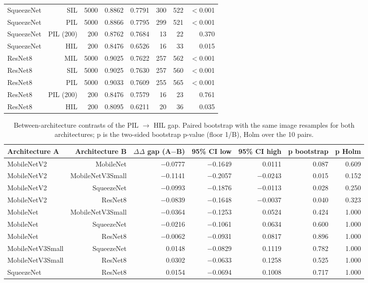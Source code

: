 \begin{table}[htbp]
\begin{tabular}{lrrrrrrr}
SqueezeNet & SIL & 5000 & 0.8862 & 0.7791 & 300 & 522 & $<$0.001 \\
SqueezeNet & PIL & 5000 & 0.8866 & 0.7795 & 299 & 521 & $<$0.001 \\
SqueezeNet & PIL (200) & 200 & 0.8762 & 0.7684 & 13 & 22 & 0.370 \\
SqueezeNet & HIL & 200 & 0.8476 & 0.6526 & 16 & 33 & 0.015 \\
ResNet8 & MIL & 5000 & 0.9025 & 0.7622 & 257 & 562 & $<$0.001 \\
ResNet8 & SIL & 5000 & 0.9025 & 0.7630 & 257 & 560 & $<$0.001 \\
ResNet8 & PIL & 5000 & 0.9033 & 0.7609 & 255 & 565 & $<$0.001 \\
ResNet8 & PIL (200) & 200 & 0.8476 & 0.7579 & 16 & 23 & 0.761 \\
ResNet8 & HIL & 200 & 0.8095 & 0.6211 & 20 & 36 & 0.035 \\
\bottomrule
\end{tabular}
\end{table}

\begin{table}[htbp]
\centering
\scriptsize
\caption{Between-architecture contrasts of the PIL $\rightarrow$ HIL gap. Paired bootstrap with the same image resamples for both architectures; p is the two-sided bootstrap p-value (floor 1/B), Holm over the 10 pairs.}
\label{tab:ladder-coco-6}
\begin{tabular}{lrrrrrr}
\toprule
Architecture A & Architecture B & $\Delta$$\Delta$ gap (A$-$B) & 95\% CI low & 95\% CI high & p bootstrap & p Holm \\
\midrule
MobileNetV2 & MobileNet & $-$0.0777 & $-$0.1649 & 0.0111 & 0.087 & 0.609 \\
MobileNetV2 & MobileNetV3Small & $-$0.1141 & $-$0.2057 & $-$0.0243 & 0.015 & 0.152 \\
MobileNetV2 & SqueezeNet & $-$0.0993 & $-$0.1876 & $-$0.0113 & 0.028 & 0.250 \\
MobileNetV2 & ResNet8 & $-$0.0839 & $-$0.1648 & $-$0.0037 & 0.040 & 0.323 \\
MobileNet & MobileNetV3Small & $-$0.0364 & $-$0.1253 & 0.0524 & 0.424 & 1.000 \\
MobileNet & SqueezeNet & $-$0.0216 & $-$0.1061 & 0.0634 & 0.600 & 1.000 \\
MobileNet & ResNet8 & $-$0.0062 & $-$0.0931 & 0.0817 & 0.896 & 1.000 \\
MobileNetV3Small & SqueezeNet & 0.0148 & $-$0.0829 & 0.1119 & 0.782 & 1.000 \\
MobileNetV3Small & ResNet8 & 0.0302 & $-$0.0633 & 0.1258 & 0.525 & 1.000 \\
SqueezeNet & ResNet8 & 0.0154 & $-$0.0694 & 0.1008 & 0.717 & 1.000 \\
\bottomrule
\end{tabular}
\end{table}

